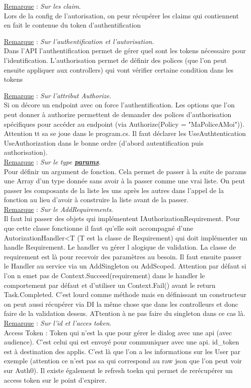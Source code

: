 \documentclass[a4paper,12pt,twoside]{article}
\newcommand{\urlcolor}{magenta}  %
\newcommand{\keycolor}{purple} %
\newcommand{\rem}[2]{\noindent\underline{Remarque} : \textit{#1}.\\ \indent #2}
\newcommand{\keyref}[2]{\hypersetup{urlcolor=\keycolor} \href{#1}{\textbf{#2}}\hypersetup{urlcolor=\urlcolor}}
\begin{document}
\rem{Sur les claim}{Lors de la config de l'autorisation, on peur récupérer les claims qui contiennent en fait le contenue du token d'authentification}

\rem{Sur l'authentification et l'autorisation}{Dans l'API l'authentification permet de gérer quel sont les tokens nécessaire pour l'identification. L'authorisation permet de définir des polices (que l'on peut ensuite appliquer aux controllers) qui vont vérifier certaine condition dans les tokens}

\rem{Sur l'attribut Authorize}{Si on décore un endpoint avec on force l'authentification. Les options que l'on peut donner à authorize permettent de demander des polices d'authorisation spécifiques pour accéder au endpoint (via Authorize(Policy = "MaPoliceAMoi")). Attention tt sa se joue dans le program.cs. Il faut déclarer les UseAuthtentication UseAuthorization dans le bonne ordre (d'abord autentification puis authorisation).}\\

\rem{Sur le type \keyref{https://docs.microsoft.com/en-us/dotnet/csharp/language-reference/keywords/params}{params}}{Pour définir un argument de fonction. Cela permet de passer à la suite de params une Array d'un type donnée sans avoir à la passer comme une vrai liste. On peut passer les composants de la liste les uns après les autres dans l'appel de la fonction au lieu d'avoir à construire la liste avant de la passer.}\\

\rem{Sur le AddRequirements}{Il faut lui passer des objets qui implémentent IAuthorizationRequirement. Pour que cette classe fonctionne il faut qu'elle soit accompagné d'une AutorizationHandler<T (T est la classe de Requirement) qui doit implémenter un handle Requirement. Le handler va gérer l alogique de validation. La classe de requirement est là pour recevoir des paramètres au besoin.  Il faut ensuite passer le Handler au service via un AddSingleton ou AddScoped. Attention par défaut si l'on n emet pas de Context.Succeed(requirement) dans le handler le comportement par défaut et d'utiliser un Context.Fail() avant le return Task.Completed. C'est lourd comme méthode mais en définissant un constructeur on peut aussi récupérer via DI la même chose que dans les controlleurs et donc faire de la validation dessus. ATtention à ne pas faire du singleton dans ce cas là.}\\

\rem{Sur l'id et l'acces token}{Access Token : Token qui n'est la que pour gérer le dialog avec une api (avec audience). C'est celui qui est envoyé pour communiquer avec une api. id\_token est à destination des applis. C'est là que l'on a les informations sur les User par exemple (attention ce n'est pas sa qui correspond au raw json que l'on peut voir sur Auth0). Il existe également le refresh toekn qui permet de rerécupérer un access token sur le point d'expirer.}\\
\end{document}
